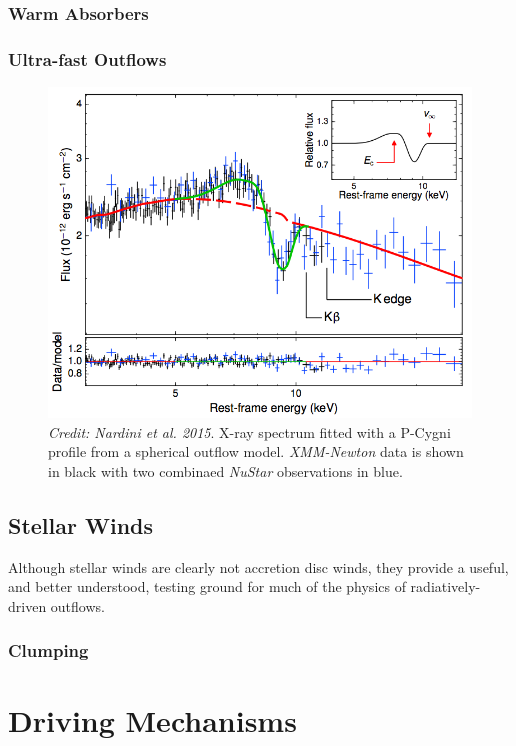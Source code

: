 \subsubsection{Warm Absorbers}

\subsubsection{Ultra-fast Outflows}

\begin{figure}
\centering
\includegraphics[width=1.0\textwidth]{figures/02-outflows/nardini_pds456.png}
\caption
{
{\sl Credit: Nardini et al. 2015}. 
X-ray spectrum fitted with a P-Cygni profile from a spherical outflow model.
{\sl XMM-Newton} data is shown in black with two combinaed {\sl NuStar}
observations in blue.
} 
\label{fig:nardini}
\end{figure}


\subsection{Stellar Winds}

Although stellar winds are clearly not accretion disc winds,
they provide a useful, and better understood, testing ground for much
of the physics of radiatively-driven outflows.

\subsubsection{Clumping}


\section{Driving Mechanisms}

